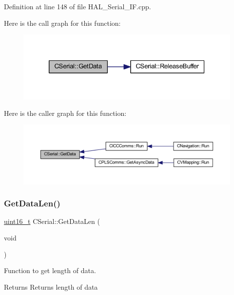 Definition at line 148 of file H\+A\+L\+\_\+\+Serial\+\_\+\+I\+F.\+cpp.

Here is the call graph for this function\+:
\nopagebreak
\begin{figure}[H]
\begin{center}
\leavevmode
\includegraphics[width=320pt]{class_c_serial_abad86c07f530569b2ceeea75bda485ad_cgraph}
\end{center}
\end{figure}
Here is the caller graph for this function\+:
\nopagebreak
\begin{figure}[H]
\begin{center}
\leavevmode
\includegraphics[width=350pt]{class_c_serial_abad86c07f530569b2ceeea75bda485ad_icgraph}
\end{center}
\end{figure}
\mbox{\label{class_c_serial_a4327d6041fe9a390612b214709027cbb}} 
\subsubsection{\texorpdfstring{Get\+Data\+Len()}{GetDataLen()}}
{\footnotesize\ttfamily \mbox{\hyperlink{_a_d_a_s___types_8h_a1f1825b69244eb3ad2c7165ddc99c956}{uint16\+\_\+t}} C\+Serial\+::\+Get\+Data\+Len (\begin{DoxyParamCaption}\item[{void}]{ }\end{DoxyParamCaption})}



Function to get length of data. 

\begin{DoxyReturn}{Returns}
Returns length of data 
\end{DoxyReturn}


